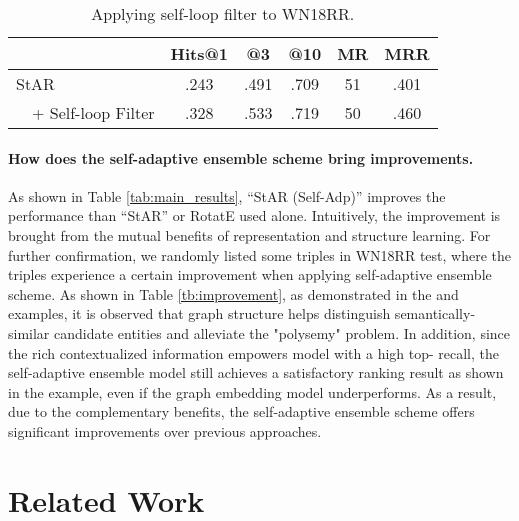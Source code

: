\documentclass[sigconf]{acmart}
\begin{document}
\begin{table}[t] \small
    \caption{\small Applying self-loop filter to WN18RR. }
    \setlength{\tabcolsep}{4pt}
	\centering
	\begin{tabular}{lccccc}
		\hline
		& \textbf{Hits@1}      & \textbf{@3}      & \textbf{@10}    & \textbf{MR} & \textbf{MRR}  \\ \hline
		StAR & .243   & .491   & .709    & 51    & .401  \\ 
		~~+ Self-loop Filter  &.328	&.533	&.719	&50	&.460   \\ \hline
	\end{tabular}
	\label{tb:self_loop}
\end{table}





\paragraph{How does the self-adaptive ensemble scheme bring improvements.}
As shown in Table \ref{tab:main_results}, ``StAR (Self-Adp)'' improves the performance than ``StAR'' or RotatE used alone. 
Intuitively, the improvement is brought from the mutual benefits of representation and structure learning. 
For further confirmation, we randomly listed some triples in WN18RR test, where the triples experience a certain improvement when applying self-adaptive ensemble scheme. 
As shown in Table \ref{tb:improvement}, as demonstrated in the  and  examples, it is observed that graph structure helps distinguish semantically-similar candidate entities and alleviate the "polysemy" problem. 
In addition, since the rich contextualized information empowers model with a high top- recall, the self-adaptive ensemble model still achieves a satisfactory ranking result as shown in the  example, even if the graph embedding model underperforms. 
As a result, due to the complementary benefits, the self-adaptive ensemble scheme offers significant improvements over previous approaches.

\section{Related Work} \label{sec:related}
\end{document}
